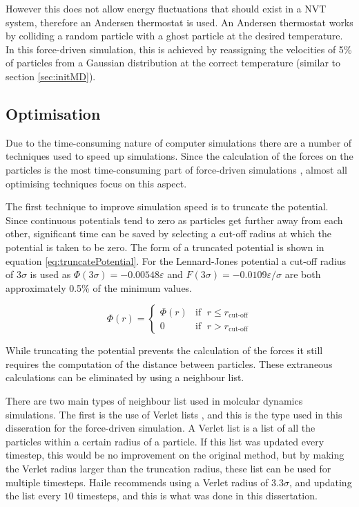 \documentclass[12pt]{UoAthesis}
\begin{document}
However this does not allow energy fluctuations that should exist in a
NVT system, therefore an Andersen thermostat\cite{Andersen1980} is
used.  An Andersen thermostat works by colliding a random particle
with a ghost particle at the desired temperature.  In this
force-driven simulation, this is achieved by reassigning the
velocities of 5\% of particles from a Gaussian distribution at the
correct temperature (similar to section \ref{sec:initMD}).

\subsection{Optimisation \label{sec:Optimisation}}

Due to the time-consuming nature of computer simulations there are a
number of techniques used to speed up simulations.  Since the
calculation of the forces on the particles is the most time-consuming
part of force-driven simulations \cite{Frenkel2002}, almost all
optimising techniques focus on this aspect.

The first technique to improve simulation speed is to truncate the
potential.  Since continuous potentials tend to zero as particles get
further away from each other, significant time can be saved by
selecting a cut-off radius at which the potential is taken to be zero.
The form of a truncated potential is shown in equation
\eqref{eq:truncatePotential}.  For the Lennard-Jones potential a
cut-off radius of $3\sigma$ is used as $\Phi(3\sigma) =
-0.00548\varepsilon$ and $F(3\sigma) = -0.0109\varepsilon/\sigma$ are
both approximately 0.5\% of the minimum values.

\begin{equation}
  \label{eq:truncatePotential}
  \Phi(r) = 
  \begin{cases}
    \Phi(r) &\text{if }\; r \leq r_{\text{cut-off}} \\
    0 & \text{if }\; r > r_{\text{cut-off}} 
  \end{cases}
\end{equation}

While truncating the potential prevents the calculation of the forces
it still requires the computation of the distance between particles.
These extraneous calculations can be eliminated by using a neighbour list.

There are two main types of neighbour list used in molcular dynamics
simulations.  The first is the use of Verlet lists \cite{Verlet1967},
and this is the type used in this disseration for the force-driven
simulation.  A Verlet list is a list of all the particles within a
certain radius of a particle.  If this list was updated every
timestep, this would be no improvement on the original method, but by
making the Verlet radius larger than the truncation radius, these list
can be used for multiple timesteps.  Haile \cite{Haile1997} recommends
using a Verlet radius of $3.3\sigma$, and updating the list every $10$
timesteps, and this is what was done in this dissertation.
\end{document}
